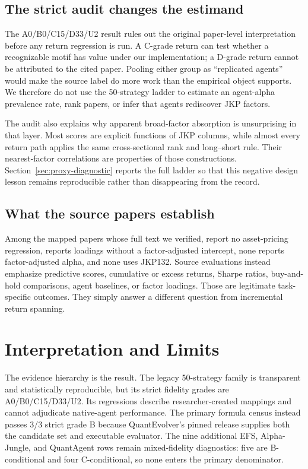 \documentclass[sigconf,anonymous]{acmart}
\begin{document}
\subsection{The strict audit changes the estimand}

The A0/B0/C15/D33/U2 result rules out the original paper-level interpretation before any return regression is run. A C-grade return can test whether a recognizable motif has value under our implementation; a D-grade return cannot be attributed to the cited paper. Pooling either group as ``replicated agents'' would make the source label do more work than the empirical object supports. We therefore do not use the 50-strategy ladder to estimate an agent-alpha prevalence rate, rank papers, or infer that agents rediscover JKP factors.

The audit also explains why apparent broad-factor absorption is unsurprising in that layer. Most scores are explicit functions of JKP columns, while almost every return path applies the same cross-sectional rank and long--short rule. Their nearest-factor correlations are properties of those constructions. Section~\ref{sec:proxy-diagnostic} reports the full ladder so that this negative design lesson remains reproducible rather than disappearing from the record.

\subsection{What the source papers establish}

Among the \SourceBenchmarkVerifiedCount mapped papers whose full text we verified, \SourceBenchmarkNoRegressionCount report no asset-pricing regression, \SourceBenchmarkLoadingsOnlyCount reports loadings without a factor-adjusted intercept, none reports factor-adjusted alpha, and none uses JKP132. Source evaluations instead emphasize predictive scores, cumulative or excess returns, Sharpe ratios, buy-and-hold comparisons, agent baselines, or factor loadings. Those are legitimate task-specific outcomes. They simply answer a different question from incremental return spanning.

\section{Interpretation and Limits}

The evidence hierarchy is the result. The legacy 50-strategy family is transparent and statistically reproducible, but its strict fidelity grades are A0/B0/C15/D33/U2. Its regressions describe researcher-created mappings and cannot adjudicate native-agent performance. The primary formula census instead passes 3/3 strict grade B because QuantEvolver's pinned release supplies both the candidate set and executable evaluator. The nine additional EFS, Alpha-Jungle, and QuantAgent rows remain mixed-fidelity diagnostics: five are B-conditional and four C-conditional, so none enters the primary denominator.
\end{document}

